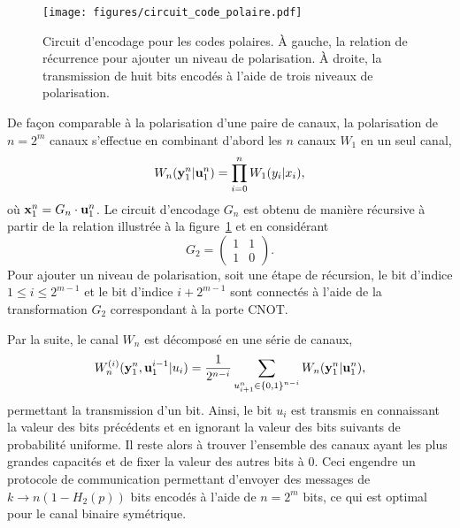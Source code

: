\begin{figure}
  \begin{center}
    \texttt{[image: figures/circuit\_code\_polaire.pdf]}
  \end{center}
  \caption[Circuit des codes polaires]{
    Circuit d'encodage pour les codes polaires.
    À gauche, la relation de récurrence pour ajouter un niveau de polarisation.
    À droite, la transmission de huit bits encodés à l'aide de trois niveaux de polarisation.
  }
  \label{fig:circuit_code_polaire}
\end{figure}

De façon comparable à la polarisation d'une paire de canaux,
la polarisation de $n = 2^m$ canaux s'effectue en combinant
d'abord les $n$ canaux $W_1$ en un seul canal,
\begin{equation}
  W_n(\vb y_1^n | \vb u_1^n) = \prod_{i=0}^n W_1(y_i | x_i),
\end{equation}
où $\vb x_1^n = G_n \cdot \vb u_1^n$.
Le circuit d'encodage $G_n$ est obtenu de manière récursive à partir de la relation illustrée
à la figure~\ref{fig:circuit_code_polaire} et en considérant 
\begin{equation}
  G_2 = 
  \begin{pmatrix}
    1 & 1 \\
    1 & 0
  \end{pmatrix}.
\end{equation}
Pour ajouter un niveau de polarisation, 
soit une étape de récursion,
le bit d'indice $1 \leq i \leq 2^{m-1}$ et le bit 
d'indice $i + 2^{m-1}$ sont connectés à l'aide de la
transformation $G_2$ correspondant à la porte CNOT.

Par la suite,
le canal $W_n$ est décomposé en une série de canaux,
\begin{equation}
  W_n^{(i)}(\vb y_1^n, \vb u_1^{i - 1} | u_i) 
  = \frac{1}{2^{n - i}}
  \sum_{u_{i+1}^n \in \qty{0, 1}^{n - i}} W_n(\vb y_1^n | \vb u_1^n),
  \label{eq:canal_polarise}
\end{equation}
permettant la transmission d'un bit.
Ainsi, 
le bit $u_i$ est transmis en connaissant la valeur des bits précédents et en 
ignorant la valeur des bits suivants de probabilité uniforme.
Il reste alors à trouver l'ensemble des canaux ayant les plus grandes capacités
et de fixer la valeur des autres bits à 0.
Ceci engendre un protocole de communication permettant d'envoyer des messages de
$k \to n(1 - H_2(p))$ bits encodés à l'aide de $n = 2^m$ bits, ce qui est optimal pour le 
canal binaire symétrique.

